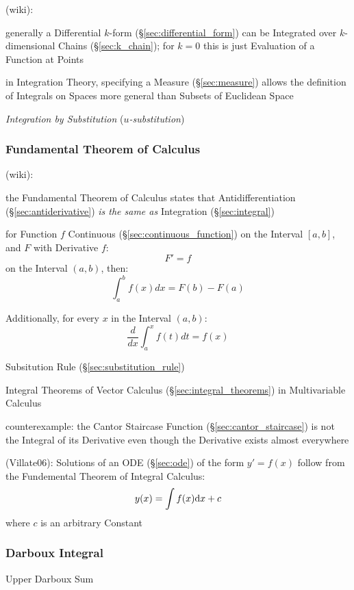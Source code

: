 {(wiki):

generally a Differential $k$-form (\S\ref{sec:differential_form}) can be
Integrated over $k$-dimensional Chains (\S\ref{sec:k_chain}); for $k=0$ this is
just Evaluation of a Function at Points

in Integration Theory, specifying a Measure (\S\ref{sec:measure}) allows the
definition of Integrals on Spaces more general than Subsets of Euclidean Space

\asterism

\emph{Integration by Substitution} (\emph{$u$-substitution})



\subsubsection{Fundamental Theorem of Calculus}
\label{sec:fundamental_calculus_theorem}

(wiki):

the Fundamental Theorem of Calculus states that Antidifferentiation
(\S\ref{sec:antiderivative}) \emph{is the
  same as} Integration (\S\ref{sec:integral})

for Function $f$ Continuous (\S\ref{sec:continuous_function}) on the Interval
$[a,b]$, and $F$ with Derivative $f$:
\[
  F' = f
\]
on the Interval $(a,b)$, then:
\[
  \int_a^b f(x) dx = F(b) - F(a)
\]

Additionally, for every $x$ in the Interval $(a,b)$:
\[
  \frac{d}{dx}\int^x_a f(t) dt = f(x)
\]

\fist Subsitution Rule (\S\ref{sec:substitution_rule})

\fist Integral Theorems of Vector Calculus
(\S\ref{sec:integral_theorems}) in Multivariable Calculus

counterexample: the Cantor Staircase Function (\S\ref{sec:cantor_staircase}) is
not the Integral of its Derivative even though the Derivative exists almost
everywhere

(Villate06): Solutions of an ODE (\S\ref{sec:ode}) of the form $y' = f(x)$
follow from the Fundemental Theorem of Integral Calculus:
\[
  y(x) = \int f(x) \mathrm{d}x + c
\]
where $c$ is an arbitrary Constant



\subsubsection{Darboux Integral}\label{sec:darboux_integral}

Upper Darboux Sum

}
